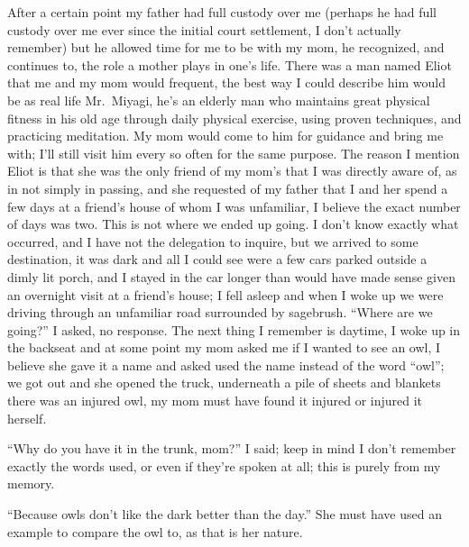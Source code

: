 \documentclass[12pt]{article}
\begin{document}
After a certain point my father had full custody over me (perhaps he had full
custody over me ever since the initial court settlement, I don't actually
remember) but he allowed time for me to be with my mom, he recognized, and
continues to, the role a mother plays in one's life. There was a man named
Eliot that me and my mom would frequent, the best way I could describe him
would be as real life Mr.\ Miyagi, he's an elderly man who maintains great
physical fitness in his old age through daily physical exercise, using proven
techniques, and practicing meditation. My mom would come to him for guidance
and bring me with; I'll still visit him every so often for the same purpose.
The reason I mention Eliot is that she was the only friend of my mom's that I
was directly aware of, as in not simply in passing, and she requested of my
father that I and her spend a few days at a friend's house of whom I was
unfamiliar, I believe the exact number of days was two. This is not where we
ended up going. I don't know exactly what occurred, and I have not the
delegation to inquire, but we arrived to some destination, it was dark and all
I could see were a few cars parked outside a dimly lit porch, and I stayed in
the car longer than would have made sense given an overnight visit at a
friend's house; I fell asleep and when I woke up we were driving through an
unfamiliar road surrounded by sagebrush.  ``Where are we going?'' I asked, no
response. The next thing I remember is daytime, I woke up in the backseat and
at some point my mom asked me if I wanted to see an owl, I believe she gave it
a name and asked used the name instead of the word ``owl''; we got out and she
opened the truck, underneath a pile of sheets and blankets there was an injured
owl, my mom must have found it injured or injured it herself.

``Why do you have it in the trunk, mom?'' I said; keep in mind I don't remember
exactly the words used, or even if they're spoken at all; this is purely from
my memory.

``Because owls don't like the dark better than the day.'' She must have used an
example to compare the owl to, as that is her nature.
\end{document}
